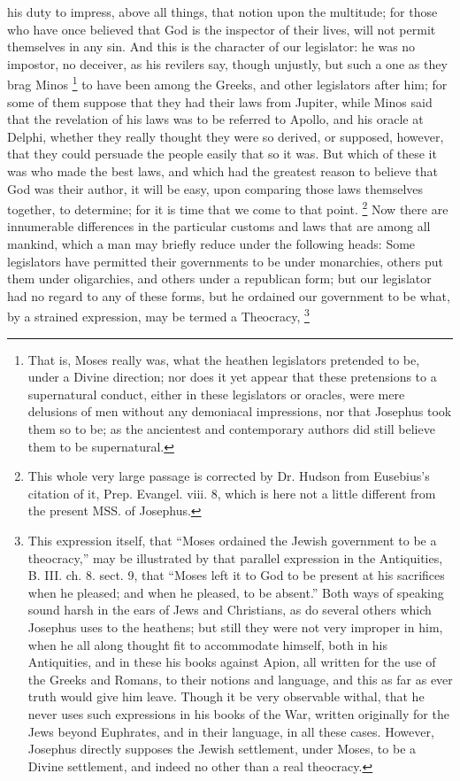 his duty to impress, above all things, that notion upon the multitude; for
those who have once believed that God is the inspector of their lives,
will not permit themselves in any sin. And this is the character of our
legislator: he was no impostor, no deceiver, as his revilers say, though
unjustly, but such a one as they brag Minos \footnote{That is, Moses really
was, what the heathen legislators pretended to be, under a Divine
direction; nor does it yet appear that these pretensions to a supernatural
conduct, either in these legislators or oracles, were mere delusions of
men without any demoniacal impressions, nor that Josephus took them so to
be; as the ancientest and contemporary authors did still believe them to
be supernatural.} to have
been among the Greeks, and other legislators after him; for some of them
suppose that they had their laws from Jupiter, while Minos said that the
revelation of his laws was to be referred to Apollo, and his oracle at
Delphi, whether they really thought they were so derived, or supposed,
however, that they could persuade the people easily that so it was. But
which of these it was who made the best laws, and which had the greatest
reason to believe that God was their author, it will be easy, upon
comparing those laws themselves together, to determine; for it is time
that we come to that point. \footnote{This whole very large
passage is corrected by Dr. Hudson from Eusebius's citation of it, Prep.
Evangel. viii. 8, which is here not a little different from the present
MSS. of Josephus.} Now there are innumerable
differences in the particular customs and laws that are among all mankind,
which a man may briefly reduce under the following heads: Some legislators
have permitted their governments to be under monarchies, others put them
under oligarchies, and others under a republican form; but our legislator
had no regard to any of these forms, but he ordained our government to be
what, by a strained expression, may be termed a Theocracy, \footnote{This expression itself,
that ``Moses ordained the Jewish government to be a theocracy,'' may be
illustrated by that parallel expression in the Antiquities, B. III. ch. 8.
sect. 9, that ``Moses left it to God to be present at his sacrifices when
he pleased; and when he pleased, to be absent.'' Both ways of speaking
sound harsh in the ears of Jews and Christians, as do several others which
Josephus uses to the heathens; but still they were not very improper in
him, when he all along thought fit to accommodate himself, both in his
Antiquities, and in these his books against Apion, all written for the use
of the Greeks and Romans, to their notions and language, and this as far
as ever truth would give him leave. Though it be very observable withal,
that he never uses such expressions in his books of the War, written
originally for the Jews beyond Euphrates, and in their language, in all
these cases. However, Josephus directly supposes the Jewish settlement,
under Moses, to be a Divine settlement, and indeed no other than a real
theocracy.}
